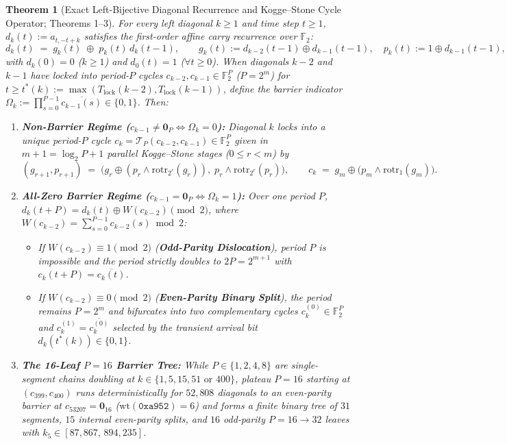 \documentclass[11pt,a4paper]{article}
\newtheorem{theorem}{Theorem}[section]
\theoremstyle{definition}
\theoremstyle{remark}
\newcommand{\Ftwo}{\mathbb{F}_2}
\newcommand{\rotr}{\mathrm{rotr}}
\begin{document}
\begin{theorem}[Exact Left-Bijective Diagonal Recurrence and Kogge--Stone Cycle Operator; Theorems 1--3]\label{thm:diag_ks}
For every left diagonal $k \ge 1$ and time step $t \ge 1$, $d_k(t) := a_{t,-t+k}$ satisfies the first-order affine carry recurrence over $\Ftwo$:
\begin{equation}
  d_k(t) \;=\; g_k(t) \;\oplus\; p_k(t)\,d_k(t-1), \qquad
  g_k(t) := d_{k-2}(t-1) \oplus d_{k-1}(t-1), \quad
  p_k(t) := 1 \oplus d_{k-1}(t-1),
\end{equation}
with $d_k(0) = 0$ ($k \ge 1$) and $d_0(t) = 1$ ($\forall t \ge 0$). When diagonals $k-2$ and $k-1$ have locked into period-$P$ cycles $c_{k-2}, c_{k-1} \in \Ftwo^P$ ($P = 2^m$) for $t \ge t^*(k) := \max(T_{\mathrm{lock}}(k-2), T_{\mathrm{lock}}(k-1))$, define the barrier indicator $\Omega_k := \prod_{s=0}^{P-1} \overline{c_{k-1}(s)} \in \{0,1\}$. Then:
\begin{enumerate}
  \item \textbf{Non-Barrier Regime ($c_{k-1} \ne \mathbf{0}_P \iff \Omega_k = 0$):} Diagonal $k$ locks into a unique period-$P$ cycle $c_k = \mathcal{T}_P(c_{k-2}, c_{k-1}) \in \Ftwo^P$ given in $m + 1 = \log_2 P + 1$ parallel Kogge--Stone stages ($0 \le r < m$) by
  \begin{equation}
    (g_{r+1}, p_{r+1}) \;=\; \bigl(g_r \oplus (p_r \land \rotr_{2^r}(g_r)),\; p_r \land \rotr_{2^r}(p_r)\bigr),
    \qquad c_k \;=\; g_m \oplus \bigl(p_m \land \rotr_1(g_m)\bigr).
  \end{equation}
  \item \textbf{All-Zero Barrier Regime ($c_{k-1} = \mathbf{0}_P \iff \Omega_k = 1$):} Over one period $P$, $d_k(t+P) = d_k(t) \oplus W(c_{k-2}) \pmod 2$, where $W(c_{k-2}) = \sum_{s=0}^{P-1} c_{k-2}(s) \bmod 2$:
  \begin{itemize}
    \item If $W(c_{k-2}) \equiv 1 \pmod 2$ (\textbf{Odd-Parity Dislocation}), period $P$ is impossible and the period strictly doubles to $2P = 2^{m+1}$ with $c_k(t+P) = \overline{c_k(t)}$.
    \item If $W(c_{k-2}) \equiv 0 \pmod 2$ (\textbf{Even-Parity Binary Split}), the period remains $P = 2^m$ and bifurcates into two complementary cycles $c_k^{(0)} \in \Ftwo^P$ and $c_k^{(1)} = \overline{c_k^{(0)}}$ selected by the transient arrival bit $d_k(t^*(k)) \in \{0,1\}$.
  \end{itemize}
  \item \textbf{The 16-Leaf $P=16$ Barrier Tree:} While $P \in \{1,2,4,8\}$ are single-segment chains doubling at $k \in \{1, 5, 15, 51\text{ or }400\}$, plateau $P = 16$ starting at $(c_{399}, c_{400})$ runs deterministically for $52{,}808$ diagonals to an even-parity barrier at $c_{53207} = \mathbf{0}_{16}$ ($\mathrm{wt}(\mathtt{0xa952}) = 6$) and forms a finite binary tree of $31$ segments, $15$ internal even-parity splits, and $16$ odd-parity $P = 16 \to 32$ leaves with $k_5 \in [87{,}867,\, 894{,}235]$.
\end{enumerate}
\end{theorem}
\end{document}
